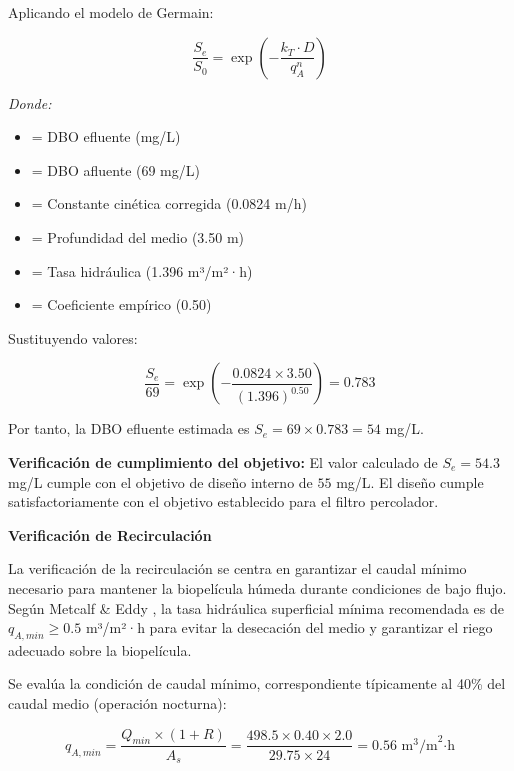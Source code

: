 \documentclass[12pt,a4paper]{article}
\begin{document}
Aplicando el modelo de Germain:

\begin{equation}
\frac{S_e}{S_0} = \exp\left(-\frac{k_T \cdot D}{q_A^n}\right)
\end{equation}

\textit{Donde:}
\begin{itemize}[noitemsep,leftmargin=2em]
    \item[$S_e$] = DBO efluente (mg/L)
    \item[$S_0$] = DBO afluente (69 mg/L)
    \item[$k_T$] = Constante cinética corregida (0.0824 m/h)
    \item[$D$] = Profundidad del medio (3.50 m)
    \item[$q_A$] = Tasa hidráulica (1.396 m³/m²·h)
    \item[$n$] = Coeficiente empírico (0.50)
\end{itemize}

Sustituyendo valores:

\begin{equation}
\frac{S_e}{69} = \exp\left(-\frac{0.0824 \times 3.50}{(1.396)^{0.50}}\right) = 0.783
\end{equation}

Por tanto, la DBO efluente estimada es $S_e = 69 \times 0.783 = 54$ mg/L.

\textbf{Verificación de cumplimiento del objetivo:} El valor calculado de $S_e = 54.3$ mg/L cumple con el objetivo de diseño interno de $55$ mg/L. El diseño cumple satisfactoriamente con el objetivo establecido para el filtro percolador.

\textbf{Verificación de Recirculación}

La verificación de la recirculación se centra en garantizar el caudal mínimo necesario para mantener la biopelícula húmeda durante condiciones de bajo flujo. Según Metcalf \& Eddy \cite{metcalf2014}, la tasa hidráulica superficial mínima recomendada es de $q_{A,min} \geq 0.5$ m³/m²·h para evitar la desecación del medio y garantizar el riego adecuado sobre la biopelícula.

Se evalúa la condición de caudal mínimo, correspondiente típicamente al 40\% del caudal medio (operación nocturna):

\begin{equation}
q_{A,min} = \frac{Q_{min} \times (1 + R)}{A_s} = \frac{498.5 \times 0.40 \times 2.0}{29.75 \times 24} = 0.56 \text{ m}^3\text{/m}^2\text{·h}
\end{equation}
\end{document}
